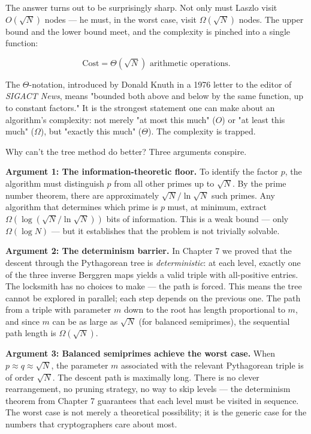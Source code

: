 \documentclass[12pt, letterpaper, openany]{book}
\theoremstyle{definition}
\theoremstyle{remark}
\begin{document}
The answer turns out to be surprisingly sharp. Not only must Laszlo visit $O(\sqrt{N})$ nodes --- he must, in the worst case, visit $\Omega(\sqrt{N})$ nodes. The upper bound and the lower bound meet, and the complexity is pinched into a single function:

\[
\text{Cost} = \Theta(\sqrt{N}) \text{ arithmetic operations.}
\]

The $\Theta$-notation, introduced by Donald Knuth in a 1976 letter to the editor of \textit{SIGACT News}, means "bounded both above and below by the same function, up to constant factors." It is the strongest statement one can make about an algorithm's complexity: not merely "at most this much" ($O$) or "at least this much" ($\Omega$), but "exactly this much" ($\Theta$). The complexity is trapped.

Why can't the tree method do better? Three arguments conspire.

\textbf{Argument 1: The information-theoretic floor.} To identify the factor $p$, the algorithm must distinguish $p$ from all other primes up to $\sqrt{N}$. By the prime number theorem, there are approximately $\sqrt{N} / \ln \sqrt{N}$ such primes. Any algorithm that determines which prime is $p$ must, at minimum, extract $\Omega(\log(\sqrt{N} / \ln \sqrt{N}))$ bits of information. This is a weak bound --- only $\Omega(\log N)$ --- but it establishes that the problem is not trivially solvable.

\textbf{Argument 2: The determinism barrier.} In Chapter 7 we proved that the descent through the Pythagorean tree is \textit{deterministic}: at each level, exactly one of the three inverse Berggren maps yields a valid triple with all-positive entries. The locksmith has no choices to make --- the path is forced. This means the tree cannot be explored in parallel; each step depends on the previous one. The path from a triple with parameter $m$ down to the root has length proportional to $m$, and since $m$ can be as large as $\sqrt{N}$ (for balanced semiprimes), the sequential path length is $\Omega(\sqrt{N})$.

\textbf{Argument 3: Balanced semiprimes achieve the worst case.} When $p \approx q \approx \sqrt{N}$, the parameter $m$ associated with the relevant Pythagorean triple is of order $\sqrt{N}$. The descent path is maximally long. There is no clever rearrangement, no pruning strategy, no way to skip levels --- the determinism theorem from Chapter 7 guarantees that each level must be visited in sequence. The worst case is not merely a theoretical possibility; it is the generic case for the numbers that cryptographers care about most.
\end{document}

